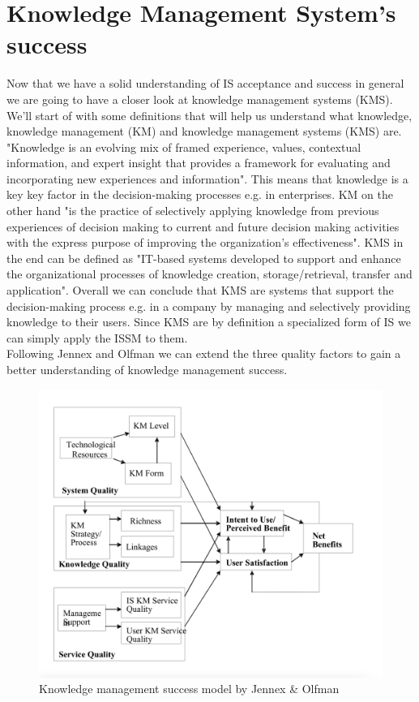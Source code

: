 \documentclass[
	english,
	ruledheaders=section,%
	class=report,%
	thesis={type=bachelor},%
	accentcolor=1b,%
	custommargins=true,%
	marginpar=false,%
	parskip=half-,%
	fontsize=11pt,%
	DIV=14,
]{tudapub}
\begin{document}
\newpage
\section{Knowledge Management System's success}
Now that we have a solid understanding of IS acceptance and success in general we are going to have a closer look at knowledge management systems (KMS). We'll start of with some definitions that will help us understand what knowledge, knowledge management (KM) and knowledge management systems (KMS) are. "Knowledge is an evolving mix of framed experience, values, contextual information, and expert insight that provides a framework for evaluating and incorporating new experiences and information". This means that knowledge is a key key factor in the decision-making processes e.g. in enterprises. KM on the other hand "is the practice of selectively applying knowledge from previous experiences of decision making to current and future decision making activities with the express purpose of improving the organization’s effectiveness". KMS in the end can be defined as "IT-based systems developed to support and enhance the organizational processes of knowledge creation, storage/retrieval, transfer and application". Overall we can conclude that KMS are systems that support the decision-making process e.g. in a company by managing and selectively providing knowledge to their users. Since KMS are by definition a specialized form of IS we can simply apply the ISSM to them.\\
Following Jennex and Olfman we can extend the three quality factors to gain a better understanding
of knowledge management success.\\
\begin{figure}
    \centering
    \includegraphics[width=1\linewidth]{knowledge_management_success.png}
    \caption{Knowledge management success model by Jennex & Olfman}
    \label{fig:enter-label}
\end{figure}
\end{document}
